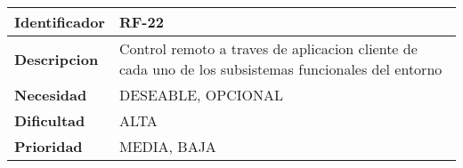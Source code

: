 \begin{center}
    \begin{tabular}{|p{2.6cm}|p{12cm}|}
    \hline
    \textbf{Identificador} & RF-22\\
    \hline
    \textbf{Descripcion} & Control remoto a traves de aplicacion cliente de cada uno de los subsistemas funcionales del entorno\\
    \hline
    \textbf{Necesidad} & DESEABLE, OPCIONAL\\
    \hline
    \textbf{Dificultad} & ALTA\\
    \hline
    \textbf{Prioridad} & MEDIA, BAJA\\
    \hline
    \end{tabular}
\end{center}
